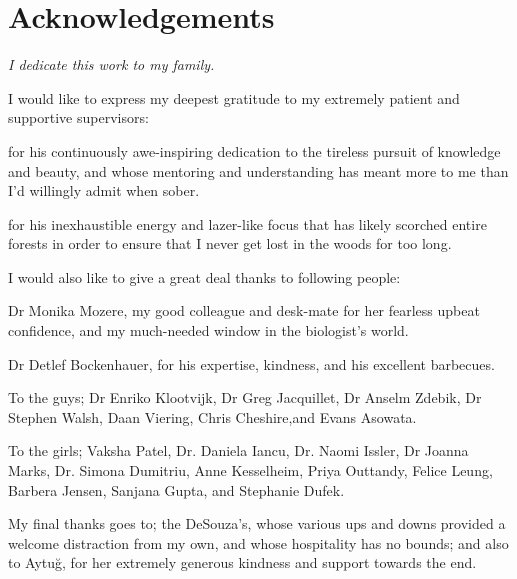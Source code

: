 \chapter*{Acknowledgements}
\vfill
\textit{\large I dedicate this work to my family.}

\vfill

\noindent
I would like to express my deepest gratitude to my extremely patient and supportive supervisors:
\vspace{-5pt}
\begin{description}[labelsep=0.5em, align=left, labelwidth=0em, labelindent=1em, leftmargin=0em]
\item[\bf Dr Horia Stanescu]{for his continuously awe-inspiring dedication to the tireless pursuit of knowledge and beauty, and whose mentoring and understanding has meant more to me than I'd willingly admit when sober.}
\item[\bf Prof Robert Kleta]{for his inexhaustible energy and lazer-like focus that has likely scorched entire forests in order to ensure that I never get lost in the woods for too long.}
\end{description}

\vfill
\begin{spacing}{1.3}
\noindent
I would also like to give a great deal thanks to following people:
\vspace{-8pt}
\begin{description}[labelsep=0.5em, align=left, labelwidth=0em, labelindent=1em, leftmargin=0em]
\item{Dr Monika Mozere, my good colleague and desk-mate for her fearless upbeat confidence, and my much-needed window in the biologist's world.}
\item{Dr Detlef Bockenhauer, for his expertise, kindness, and his excellent barbecues.}
\item{To the guys; Dr Enriko Klootvijk, Dr Greg Jacquillet, Dr Anselm Zdebik, Dr Stephen Walsh, Daan Viering, Chris Cheshire,and Evans Asowata.}
\item{To the girls; Vaksha Patel, Dr. Daniela Iancu, Dr. Naomi Issler, Dr Joanna Marks, Dr. Simona Dumitriu, Anne Kesselheim, Priya Outtandy, Felice Leung, Barbera Jensen, Sanjana Gupta, and Stephanie Dufek.}
\end{description}
\end{spacing}

\vfill
\noindent
My final thanks goes to; the DeSouza's, whose various ups and downs provided a welcome distraction from my own, and whose hospitality has no bounds; and also to Aytu\u{g}, for her extremely generous kindness and support towards the end.